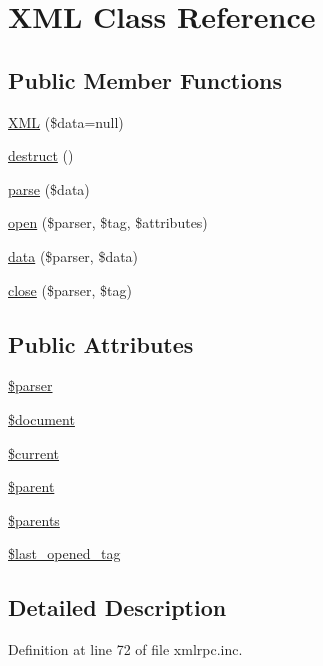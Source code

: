 \hypertarget{classXML}{
\section{XML Class Reference}
\label{classXML}
}
\subsection*{Public Member Functions}
\begin{CompactItemize}
\item 
\hyperlink{classXML_1475a1374023931e2227277f4047c9aa}{XML} (\$data=null)
\item 
\hyperlink{classXML_d1524d80c783b2cd22966462411b9b7d}{destruct} ()
\item 
\hyperlink{classXML_61e6258dc3d5750100e1f0dd08d6334a}{parse} (\$data)
\item 
\hyperlink{classXML_eac7eae74d866d4f5a0cdb9be27ff279}{open} (\$parser, \$tag, \$attributes)
\item 
\hyperlink{classXML_ca70dfbd3e8ce956075181701b09b033}{data} (\$parser, \$data)
\item 
\hyperlink{classXML_60144a2134fc1b7f5b4b1b6a7c56bf04}{close} (\$parser, \$tag)
\end{CompactItemize}
\subsection*{Public Attributes}
\begin{CompactItemize}
\item 
\hyperlink{classXML_fa14fbca44236b30ab5f3dcfc4b02890}{\$parser}
\item 
\hyperlink{classXML_01d565098eeda8bf09e4242a2748d570}{\$document}
\item 
\hyperlink{classXML_7c20d75c1719294f3320a537a32753ca}{\$current}
\item 
\hyperlink{classXML_fa51193c2f0b317f817fa3efa8722227}{\$parent}
\item 
\hyperlink{classXML_c10be009a77c59e80ce5562d4dd35532}{\$parents}
\item 
\hyperlink{classXML_60e7e74df6643f50e0c6ea8252554b3d}{\$last\_\-opened\_\-tag}
\end{CompactItemize}


\subsection{Detailed Description}


Definition at line 72 of file xmlrpc.inc.

